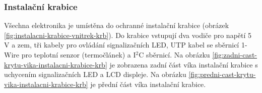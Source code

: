 \subsubsection{Instalační krabice}
Všechna elektronika je umístěna do ochranné instalační krabice (obrázek \ref{fig:instalacni-krabice-vnitrek-krb}). Do krabice vstupují dva vodiče pro napětí 5 V a zem, tři kabely pro ovládání signalizačních LED, UTP kabel se sběrnicí 1-Wire pro teplotní senzor (termočlánek) a I$^2$C sběrnicí. Na obrázku \ref{fig:zadni-cast-krytu-vika-instalacni-krabice-krb} je zobrazena zadní část víka instalační krabice s uchycením signalizačních LED a LCD displeje. Na obrázku \ref{fig:predni-cast-krytu-vika-instalacni-krabice-krb} je přední část víka instalační krabice.




